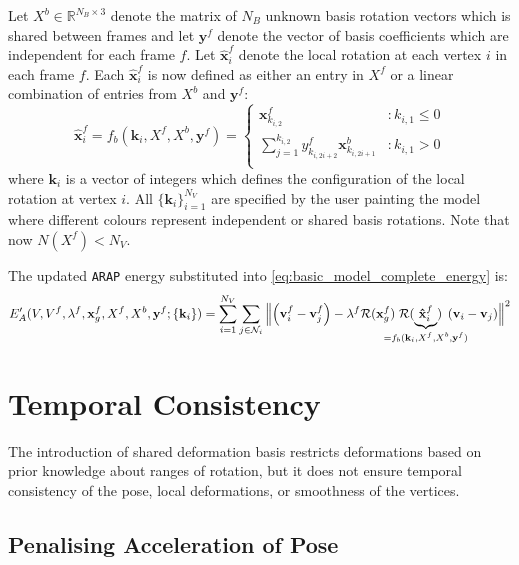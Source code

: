 \documentclass[a4paper,10pt]{article}
\newcommand{\mb}{\mathbf}
\def\clap#1{\hbox to 0pt{\hss#1\hss}}
\def\mathclap{\mathpalette\mathclapinternal}
\def\mathclapinternal#1#2{%
\clap{$\mathsurround=0pt#1{#2}$}%
}
\begin{document}
Let $X^b \in \mathbb{R}^{N_B \times 3}$ denote the matrix of $N_B$ unknown basis rotation vectors which is shared between frames and let $\mb{y}^f$ denote the vector of basis coefficients which are independent for each frame $f$.
Let $\mb{\hat x}_i^f$ denote the local rotation at each vertex $i$ in each frame $f$. 
Each $\mb{\hat x}_i^f$ is now defined as either an entry in $X^f$ or a linear combination of entries from $X^b$ and $\mb{y}^f$:
\begin{equation}
\label{eq:basis_local_rotation}
\mb{\hat x}_i^f = f_b(\mb{k}_i, X^f, X^b, \mb{y}^f) = \left\{  
\begin{array}{lr}
\mb{x}^f_{k_{i,2}} & \colon k_{i,1} \leq 0 \\
\displaystyle \sum_{j=1}^{k_{i,2}} y^f_{k_{i,{2i + 2}}} \mb{x}^b_{k_{i,{2i + 1}}} & \colon k_{i,1} > 0 \\
\end{array}
\right.
\end{equation}
where $\mb{k}_i$ is a vector of integers which defines the configuration of the local rotation at vertex $i$.
All $\{\mb{k}_i\}_{i=1}^{N_V}$ are specified by the user painting the model where different colours represent independent or shared basis rotations.
Note that now $N(X^f) < N_V$.

The updated \texttt{ARAP} energy substituted into \eqref{eq:basic_model_complete_energy} is:
\begin{equation}
\label{eq:basis_arap}
E'_A(V, V^f, \lambda^f, \mb{x}^f_g, X^f, X^b, \mb{y}^f ; \{\mb{k}_i\}) = \sum_{i=1}^{N_V} \sum_{j \in \mathcal{N}_i} 
\left\| 
\left( \mb{v}^f_i - \mb{v}^f_j \right) - \lambda^f \mathcal{R}(\mb{x}^f_g) 
\right.
\mathcal{R}(\underbrace{\mb{\hat x}^f_i}_{\mathclap{= f_b(\mb{k}_i, X^f, X^b, \mb{y}^f)}}) 
\left. \vphantom{\left( \mb{v}^f_i - \mb{v}^f_j \right)}
\left( \mb{v}_i - \mb{v}_j \right) 
\right\|^2
\end{equation}

\section{Temporal Consistency}
The introduction of shared deformation basis restricts deformations based on prior knowledge about ranges of rotation, but it does not ensure temporal consistency of the pose, local deformations, or smoothness of the vertices.

\subsection{Penalising Acceleration of Pose}
\end{document}

